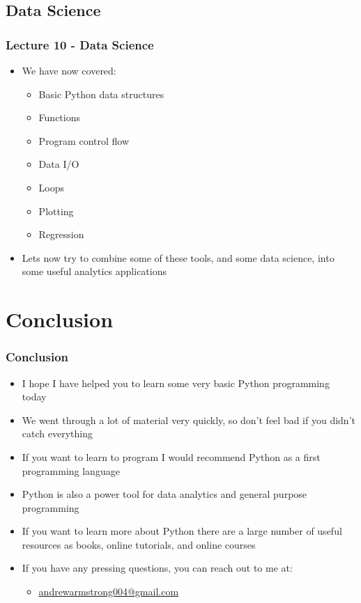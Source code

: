 \documentclass[mini frame in current subsection]{beamer}
\begin{document}
	\subsection{Data Science}
	
		\begin{frame}
			\frametitle{Lecture 10 - Data Science}
			\begin{itemize}
				\vfill\item  We have now covered:
					\begin{itemize}
						\item  Basic Python data structures
						\item  Functions
						\item  Program control flow
						\item  Data I/O
						\item  Loops
						\item  Plotting
						\item  Regression
					\end{itemize}
				\vfill\item  Lets now try to combine some of these tools, and some data science, into some useful analytics applications
			\end{itemize}
		\end{frame}
		
\section{Conclusion}

	\begin{frame}
		\frametitle{Conclusion}
		\begin{itemize}
			\item  I hope I have helped you to learn some very basic Python programming today
			\item  We went through a lot of material very quickly, so don't feel bad if you didn't catch everything
			\item  If you want to learn to program I would recommend Python as a first programming language
			\item  Python is also a power tool for data analytics and general purpose programming
			\item  If you want to learn more about Python there are a large number of useful resources as books, online tutorials, and online courses
			\item  If you have any pressing questions, you can reach out to me at:
				\begin{itemize}
					\item  \href{mailto:andrewarmstrong004@gmail.com}{andrewarmstrong004@gmail.com}
				\end{itemize}
		\end{itemize}
	\end{frame}
		
\end{document}
